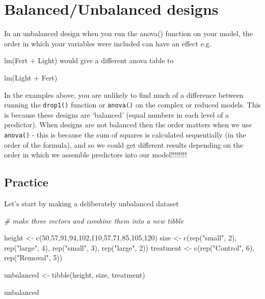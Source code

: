 \documentclass[
]{book}
\makeatletter
\newenvironment{Shaded}{\begin{snugshade}}{\end{snugshade}}
\newcommand{\CommentTok}[1]{\textcolor[rgb]{0.56,0.35,0.01}{\textit{#1}}}
\newcommand{\DecValTok}[1]{\textcolor[rgb]{0.00,0.00,0.81}{#1}}
\newcommand{\FunctionTok}[1]{\textcolor[rgb]{0.00,0.00,0.00}{#1}}
\newcommand{\NormalTok}[1]{#1}
\newcommand{\OtherTok}[1]{\textcolor[rgb]{0.56,0.35,0.01}{#1}}
\newcommand{\StringTok}[1]{\textcolor[rgb]{0.31,0.60,0.02}{#1}}
\newenvironment{kframe}{%
\medskip{}
\setlength{\fboxsep}{.8em}
 \def\at@end@of@kframe{}%
 \ifinner\ifhmode%
  \def\at@end@of@kframe{\end{minipage}}%
  \begin{minipage}{\columnwidth}%
 \fi\fi%
 \def\FrameCommand##1{\hskip\@totalleftmargin \hskip-\fboxsep
 \colorbox{shadecolor}{##1}\hskip-\fboxsep
     \hskip-\linewidth \hskip-\@totalleftmargin \hskip\columnwidth}%
 \MakeFramed {\advance\hsize-\width
   \@totalleftmargin\z@ \linewidth\hsize
   \@setminipage}}%
 {\par\unskip\endMakeFramed%
 \at@end@of@kframe}
\newenvironment{block}[1]
  {
  \begin{itemize}
  \renewcommand{\labelitemi}{
    \raisebox{-.7\height}[0pt][0pt]{
      {\setkeys{Gin}{width=3em,keepaspectratio}\texttt{[image: images/\#1]}}
    }
  }
  \setlength{\fboxsep}{1em}
  \begin{kframe}
  \item
  }
  {
  \end{kframe}
  \end{itemize}
  }
\newenvironment{rmdwarning}
  {\begin{block}{warning}}
  {\end{block}}
\makeatother
\begin{document}
\hypertarget{balancedunbalanced-designs}{%
\section{Balanced/Unbalanced designs}\label{balancedunbalanced-designs}}

\begin{rmdwarning}
In an unbalanced design when you run the anova() function on your model,
the order in which your variables were included can have an effect e.g.~

lm(Fert + Light) would give a different anova table to

lm(Light + Fert)
\end{rmdwarning}

In the examples above, you are unlikely to find much of a difference between running the \texttt{drop1()} function or \texttt{anova()} on the complex or reduced models. This is because these designs are `balanced' (equal numbers in each level of a predictor). When designs are not balanced then the order matters when we use \texttt{anova()} - this is because the sum of squares is calculated sequentially (in the order of the formula), and so we could get different results depending on the order in which we assemble predictors into our model!!!!!!!!

\hypertarget{practice-1}{%
\subsection{Practice}\label{practice-1}}

Let's start by making a deliberately unbalanced dataset

\begin{Shaded}
\begin{Highlighting}[]
\CommentTok{\# make three vectors and combine them into a new tibble}

\NormalTok{height }\OtherTok{\textless{}{-}} \FunctionTok{c}\NormalTok{(}\DecValTok{50}\NormalTok{,}\DecValTok{57}\NormalTok{,}\DecValTok{91}\NormalTok{,}\DecValTok{94}\NormalTok{,}\DecValTok{102}\NormalTok{,}\DecValTok{110}\NormalTok{,}\DecValTok{57}\NormalTok{,}\DecValTok{71}\NormalTok{,}\DecValTok{85}\NormalTok{,}\DecValTok{105}\NormalTok{,}\DecValTok{120}\NormalTok{)}
\NormalTok{size }\OtherTok{\textless{}{-}} \FunctionTok{c}\NormalTok{(}\FunctionTok{rep}\NormalTok{(}\StringTok{"small"}\NormalTok{, }\DecValTok{2}\NormalTok{), }\FunctionTok{rep}\NormalTok{(}\StringTok{"large"}\NormalTok{, }\DecValTok{4}\NormalTok{), }\FunctionTok{rep}\NormalTok{(}\StringTok{"small"}\NormalTok{, }\DecValTok{3}\NormalTok{), }\FunctionTok{rep}\NormalTok{(}\StringTok{"large"}\NormalTok{, }\DecValTok{2}\NormalTok{))}
\NormalTok{treatment }\OtherTok{\textless{}{-}} \FunctionTok{c}\NormalTok{(}\FunctionTok{rep}\NormalTok{(}\StringTok{"Control"}\NormalTok{, }\DecValTok{6}\NormalTok{), }\FunctionTok{rep}\NormalTok{(}\StringTok{"Removal"}\NormalTok{, }\DecValTok{5}\NormalTok{))}

\NormalTok{unbalanced }\OtherTok{\textless{}{-}} \FunctionTok{tibble}\NormalTok{(height, size, treatment)}

\NormalTok{unbalanced}
\end{Highlighting}
\end{Shaded}
\end{document}
